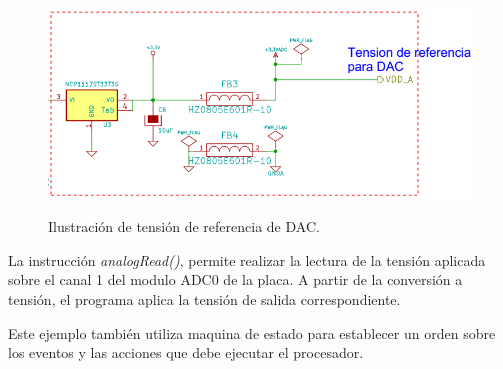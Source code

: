 \documentclass[12pt,letterpaper]{article}
\begin{document}
\begin{center}
\begin{figure}[!h]
\centering
\includegraphics[width=8 cm]{figuras/f8.png}\\
\caption{Ilustración de tensión de referencia de DAC.}
\label{Fig26}
\end{figure}
\end{center}

La instrucción \textit{analogRead()}, permite realizar la lectura de la tensión aplicada sobre el canal 1 del modulo ADC0 de la placa. A partir de la conversión a tensión, el programa aplica la tensión de salida correspondiente.

Este ejemplo también utiliza maquina de estado para establecer un orden sobre los eventos y las acciones que debe ejecutar el procesador.
\end{document}
